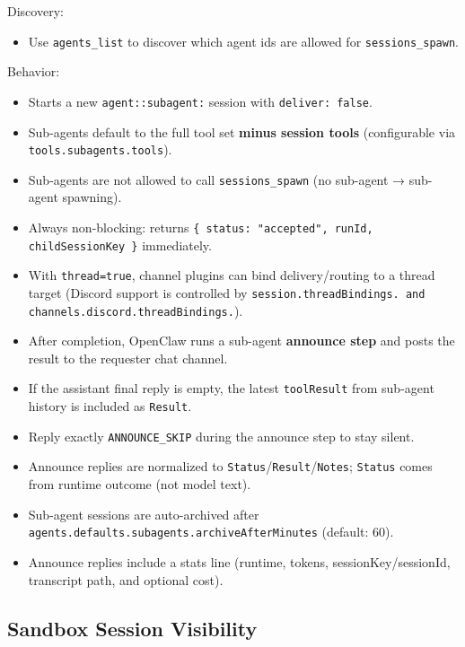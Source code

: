 Discovery:

\begin{itemize}
  \item Use \texttt{agents\_list} to discover which agent ids are allowed for \texttt{sessions\_spawn}.
\end{itemize}


Behavior:

\begin{itemize}
  \item Starts a new \texttt{agent::subagent:} session with \texttt{deliver: false}.
  \item Sub-agents default to the full tool set \textbf{minus session tools} (configurable via \texttt{tools.subagents.tools}).
  \item Sub-agents are not allowed to call \texttt{sessions\_spawn} (no sub-agent → sub-agent spawning).
  \item Always non-blocking: returns \texttt{\{ status: "accepted", runId, childSessionKey \}} immediately.
  \item With \texttt{thread=true}, channel plugins can bind delivery/routing to a thread target (Discord support is controlled by \texttt{session.threadBindings.\textit{} and \texttt{channels.discord.threadBindings.}}).
  \item After completion, OpenClaw runs a sub-agent \textbf{announce step} and posts the result to the requester chat channel.
  \item If the assistant final reply is empty, the latest \texttt{toolResult} from sub-agent history is included as \texttt{Result}.
  \item Reply exactly \texttt{ANNOUNCE\_SKIP} during the announce step to stay silent.
  \item Announce replies are normalized to \texttt{Status}/\texttt{Result}/\texttt{Notes}; \texttt{Status} comes from runtime outcome (not model text).
  \item Sub-agent sessions are auto-archived after \texttt{agents.defaults.subagents.archiveAfterMinutes} (default: 60).
  \item Announce replies include a stats line (runtime, tokens, sessionKey/sessionId, transcript path, and optional cost).
\end{itemize}


\subsection{Sandbox Session Visibility}


